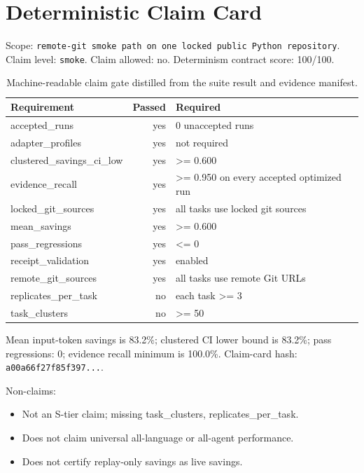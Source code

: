 \section{Deterministic Claim Card}
Scope: \texttt{remote-git smoke path on one locked public Python repository}. Claim level: \texttt{smoke}. Claim allowed: no. Determinism contract score: 100/100.

\begin{table}[h]
\centering
\begin{tabular}{lrl}
\toprule
Requirement & Passed & Required \\
\midrule
accepted\_runs & yes & 0 unaccepted runs \\
adapter\_profiles & yes & not required \\
clustered\_savings\_ci\_low & yes & >= 0.600 \\
evidence\_recall & yes & >= 0.950 on every accepted optimized run \\
locked\_git\_sources & yes & all tasks use locked git sources \\
mean\_savings & yes & >= 0.600 \\
pass\_regressions & yes & <= 0 \\
receipt\_validation & yes & enabled \\
remote\_git\_sources & yes & all tasks use remote Git URLs \\
replicates\_per\_task & no & each task >= 3 \\
task\_clusters & no & >= 50 \\
\bottomrule
\end{tabular}
\caption{Machine-readable claim gate distilled from the suite result and evidence manifest.}
\end{table}

Mean input-token savings is 83.2\%; clustered CI lower bound is 83.2\%; pass regressions: 0; evidence recall minimum is 100.0\%. Claim-card hash: \texttt{a00a66f27f85f397...}.

\noindent Non-claims:
\begin{itemize}
\item Not an S-tier claim; missing task\_clusters, replicates\_per\_task.
\item Does not claim universal all-language or all-agent performance.
\item Does not certify replay-only savings as live savings.
\end{itemize}
